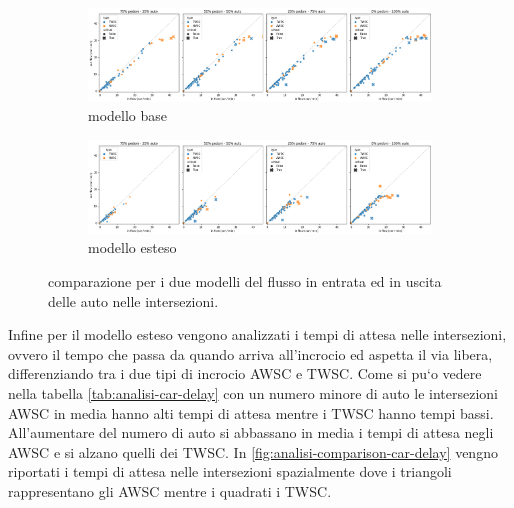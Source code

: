 \begin{figure}[ht]
    \centering
    \begin{subfigure}{0.99\textwidth}
        \centering
        \includegraphics[width=\textwidth]{images/analisi/comparison-base-in-out-flow-car.png}
        \caption{modello base}
    \end{subfigure}
    \begin{subfigure}{0.99\textwidth}
        \centering
        \includegraphics[width=\textwidth]{images/analisi/comparison-new-in-out-flow-car.png}
        \caption{modello esteso}
    \end{subfigure}
    \caption{comparazione per i due modelli del flusso in entrata ed in uscita delle auto nelle intersezioni.}
    \label{fig:analisi-comparison-in-out-flow-car}
\end{figure}

\newpage

Infine per il modello esteso vengono analizzati i tempi di attesa nelle intersezioni,
ovvero il tempo che passa da quando arriva all'incrocio ed aspetta
il via libera, differenziando tra i due tipi di incrocio AWSC e TWSC.
Come si pu`o vedere nella tabella \ref{tab:analisi-car-delay} con un numero minore di auto le intersezioni AWSC 
in media hanno alti tempi di attesa mentre i TWSC hanno tempi bassi.
All'aumentare del numero di auto si abbassano in media i tempi di attesa negli AWSC e si alzano quelli dei TWSC.
In \ref{fig:analisi-comparison-car-delay} vengno riportati i tempi di attesa nelle intersezioni spazialmente
dove i triangoli rappresentano gli AWSC mentre i quadrati i TWSC.

